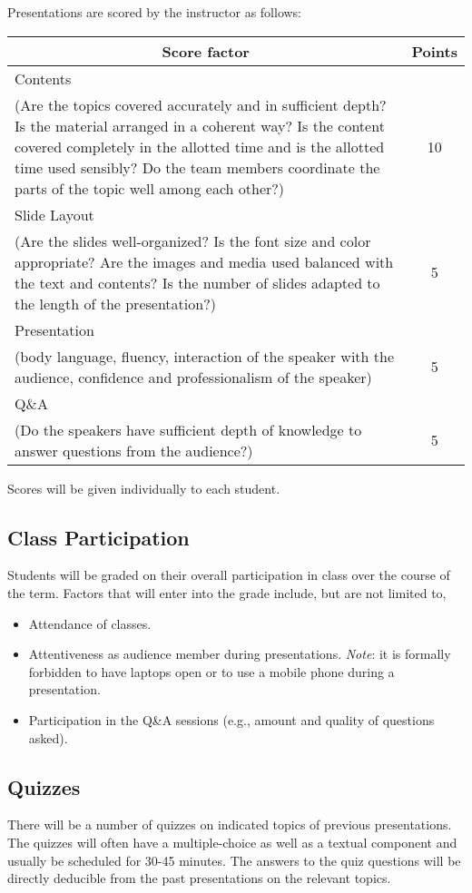 \documentclass[12pt]{article}
\begin{document}
Presentations are scored by the instructor as follows:
\begin{longtable}{p{}c}
     \multicolumn{1}{c}{Score factor}   &  Points\\
    \midrule\midrule
     Contents\\ {\scriptsize (Are the topics covered accurately and in sufficient depth? Is the material arranged in a coherent way? Is the content covered completely in the allotted time and is the allotted time used sensibly? Do the team members coordinate the parts of the topic well among each other?)\par}    &   10\\
     Slide Layout\\{\scriptsize (Are the slides well-organized? Is the font size and color appropriate? Are the images and media used balanced with the text and contents? Is the number of slides adapted to the length of the presentation?)\par}  & 5\\
     Presentation \\{\scriptsize (body language, fluency, interaction of the speaker with the audience, confidence and professionalism of the speaker)\par} & 5\\
     Q\&A\\{\scriptsize (Do the speakers have sufficient depth of knowledge to answer questions from the audience?)\par} & 5
\end{longtable}
Scores will be given individually to each student.
\subsection*{Class Participation}
Students will be graded on their overall participation in class over the course of the term. Factors that will enter into the grade include, but are not limited to, 
\begin{itemize}
    \item Attendance of classes.
    \item Attentiveness as audience member during presentations. \textit{Note}: it is formally forbidden to have laptops open or to use a mobile phone during a presentation.
    \item Participation in the Q\&A sessions (e.g., amount and quality of questions asked).
\end{itemize}
\subsection*{Quizzes}
There will be a number of quizzes on indicated topics of previous presentations. The quizzes will often have a multiple-choice as well as a textual component and usually be scheduled for 30-45 minutes. The answers to the quiz questions will be directly deducible from the past presentations on the relevant topics.  
\end{document}
